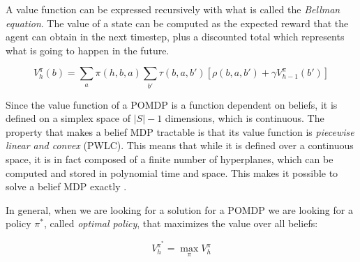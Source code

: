 A value function can be expressed recursively with what is called the \textit{Bellman equation}.
The value of a state can be computed as the expected reward that the agent can obtain in the
next timestep, plus a discounted total which represents what is going to happen in the future.

\[ V^{\pi}_{h}(b) = \sum_a \pi(h, b, a) \sum_{b'} \tau(b, a, b') \left [ \rho(b, a, b') + \gamma
V^{\pi}_{h-1}(b') \right ] \]

Since the value function of a POMDP is a function dependent on beliefs, it is defined on a simplex
space of $|S|-1$ dimensions, which is continuous. The property that makes a belief MDP tractable is
that its value function is \textit{piecewise linear and convex} (PWLC).  This means that while it is
defined over a continuous space, it is in fact composed of a finite number of hyperplanes, which can
be computed and stored in polynomial time and space. This makes it possible to solve a belief MDP
exactly \cite{cit:pomdp}.

In general, when we are looking for a solution for a POMDP we are looking for a policy $\pi^*$, called
\textit{optimal policy}, that maximizes the value over all beliefs:

\[ V^{\pi^*}_h = \max_\pi V^{\pi}_h \]

%
%
%
%
%

